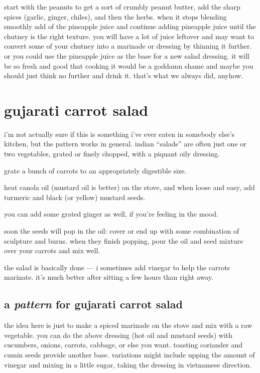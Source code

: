 start with the peanuts to get a sort of crumbly peanut butter, add the sharp 
spices (garlic, ginger, chiles), and then the herbs. when it stops blending 
smoothly add \onequarter of the pineapple juice and continue adding pineapple 
juice until the chutney is the right texture. you will have a lot of juice 
leftover and may want to convert some of your chutney into a marinade or 
dressing by thinning it further. or you could use the pineapple juice as the 
base for a new salad dressing. it will be so fresh and good that cooking it 
would be a goddamn shame and maybe you should just think no further and drink 
it. that's what we always did, anyhow.

\section{gujarati carrot salad}

i'm not actually sure if this is something i've ever eaten in somebody else's 
kitchen, but the pattern works in general. indian ``salads'' are often just one 
or two vegetables, grated or finely chopped, with a piquant oily dressing.

\begin{algorithm}
  \item grate a bunch of carrots to an appropriately digestible size.

  \item heat canola oil (mustard oil is better) on the stove, and when loose 
  and easy, add turmeric and black (or yellow) mustard seeds.

  \item you can add some grated ginger as well, if you're feeling in the mood.
\end{algorithm}

soon the seeds will pop in the oil: cover or end up with some combination of 
sculpture and burns. when they finish popping, pour the oil and seed mixture 
over your carrots and mix well.

the salad is basically done --- i sometimes add vinegar to help the carrots 
marinate. it's much better after sitting a few hours than right away.

\subsection{a \textit{pattern} for gujarati carrot salad}

the idea here is just to make a spiced marinade on the stove and mix with a raw 
vegetable. you can do the above dressing (hot oil and mustard seeds) with 
cucumbers, onions, carrots, cabbage, or  else you want. toasting 
coriander and cumin seeds provide another base. variations might include upping 
the amount of vinegar and mixing in a little sugar, taking the dressing in 
vietnamese direction.

